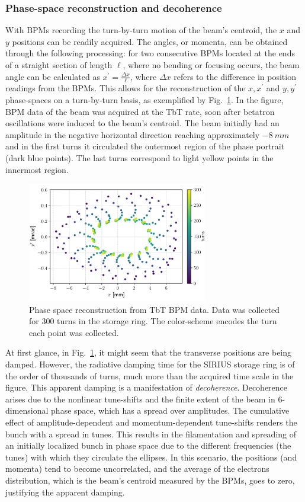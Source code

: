 \subsubsection{Phase-space reconstruction and decoherence}
With BPMs recording the turn-by-turn motion of the beam's centroid, the $x$ and $y$ positions can be readily acquired. The angles, or momenta, can be obtained through the following processing: for two consecutive BPMs located at the ends of a straight section of length $\ell$, where no bending or focusing occurs, the beam angle can be calculated as $x^\prime = \frac{\Delta x}{\ell}$, where $\Delta x$ refers to the difference in position readings from the BPMs. This allows for the reconstruction of the $x, x^\prime$ and $y, y^\prime$ phase-spaces on a turn-by-turn basis, as exemplified by Fig.~\ref{fig:phase_space_recons}. In the figure, BPM data of the beam was acquired at the TbT rate, soon after betatron oscillations were induced to the beam's centroid. The beam initially had an amplitude in the negative horizontal direction reaching approximately $-8~\unit{mm}$ and in the first turns it circulated the outermost region of the phase portrait (dark blue points). The last turns correspond to light yellow points in the innermost region.
\begin{figure}
    \centering
    \includegraphics[width=0.7\textwidth]{Images/phase_space_recons.pdf}
    \caption[Phase space reconstruction from TbT BPM data.]{Phase space reconstruction from TbT BPM data. Data was collected for 300 turns in the storage ring. The color-scheme encodes the turn each point was collected.}
    \label{fig:phase_space_recons}
\end{figure}

At first glance, in Fig.~\ref{fig:phase_space_recons}, it might seem that the transverse positions are being damped. However, the radiative damping time for the SIRIUS storage ring is of the order of thousands of turns, much more than the acquired time scale in the figure. This apparent damping is a manifestation of \textit{decoherence}. Decoherence arises due to the nonlinear tune-shifts and the finite extent of the beam in 6-dimensional phase space, which has a spread over amplitudes. The cumulative effect of amplitude-dependent and momentum-dependent tune-shifts renders the bunch with a spread in tunes. This results in the filamentation and spreading of an initially localized bunch in phase space due to the different frequencies (the tunes) with which they circulate the ellipses. In this scenario, the positions (and momenta) tend to become uncorrelated, and the average of the electrons distribution, which is the beam's centroid measured by the BPMs, goes to zero, justifying the apparent damping.
